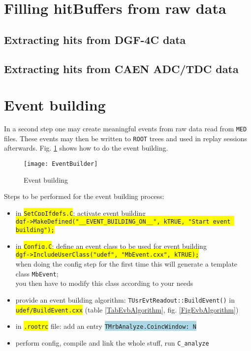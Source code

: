 \documentclass[10pt]{article}
\newcommand{\blue}[1]{\colorbox{lightblue}{\texttt{#1}}}
\newcommand{\yellow}[1]{\colorbox{yellow}{\texttt{#1}}}
\begin{document}
\section{Filling hitBuffers from raw data}\label{FillingHB}
\subsection{Extracting hits from DGF-4C data}\label{ExtractDgfHits}
\subsection{Extracting hits from CAEN ADC/TDC data}\label{ExtractCaenHits}
\newpage
\section{Event building}\label{EventBuilding}
In a second step one may create meaningful events from raw data read from \texttt{MED} files.
These events may then be written to \texttt{ROOT} trees and used in replay sessions afterwards.
Fig. \ref{EventBuilder} shows how to do the event building.

\begin{figure}[H]
\centerline{\texttt{[image: EventBuilder]}}
\caption{Event building}
\label{EventBuilder}
\end{figure}
Steps to be performed for the event building process:
\begin{center}
\begin{itemize}
\setlength{\rightmargin}{1em}%
\setlength{\leftmargin}{2em}%
\setlength{\itemsep}{0pt}%
\setlength{\parskip}{1mm}%
\setlength{\partopsep}{0pt}%
\setlength{\parsep}{0pt}%
\setlength{\topsep}{0pt}%
\item	in \yellow{SetCppIfdefs.C}: activate event building\\
	\hspace*{.2\linewidth}\yellow{dgf->MakeDefined("\_\_EVENT\_BUILDING\_ON\_\_", kTRUE, "Start event building");}
\item	in \yellow{Config.C}: define an event class to be used for event building\\
	\hspace*{.2\linewidth}\yellow{dgf->IncludeUserClass("udef", "MbEvent.cxx", kTRUE);}\\
	when doing the config step for the first time this will generate a template class \texttt{MbEvent};\\
	you then have to modify this class according to your needs
\item	provide an event building algorithm: \texttt{TUsrEvtReadout::BuildEvent()} in \yellow{udef/BuildEvent.cxx}
(table \ref{TabEvbAlgorithm}, fig. \ref{FigEvbAlgorithm})
\item	in \yellow{.rootrc} file: add an entry \blue{TMrbAnalyze.CoincWindow: N}
\item	perform config, compile and link the whole stuff, run \texttt{C\_analyze}
\end{itemize}
\end{center}
\newpage
\end{document}
